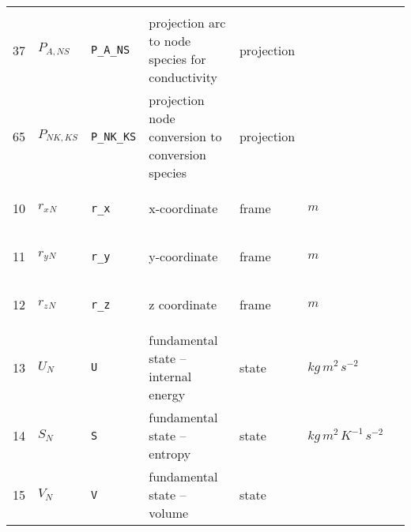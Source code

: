 \begin{longtable}{|p{1cm}|p{2.5cm}|p{4.5cm}|p{8cm}|p{3.0cm}|p{3cm}|p{1cm}|}
             & \\
    37
             & \hypertarget{"v:37"}{ $ {P}{_{A, {N S}}} $}
             & \verb|P_A_NS|
             & projection arc to node species for conductivity
             & \begin{lay}projection \end{lay}
             & $  $
             & \\
    65
             & \hypertarget{"v:65"}{ $ {P}{_{{N K}, {K S}}} $}
             & \verb|P_NK_KS|
             & projection node conversion to conversion species
             & \begin{lay}projection \end{lay}
             & $  $
             & \\
    10
             & \hypertarget{"v:10"}{ $ {{r_x}}{_{N}} $}
             & \verb|r_x|
             & x-coordinate
             & \begin{lay}frame \end{lay}
             & $ m  $
             & \\
    11
             & \hypertarget{"v:11"}{ $ {{r_y}}{_{N}} $}
             & \verb|r_y|
             & y-coordinate
             & \begin{lay}frame \end{lay}
             & $ m  $
             & \\
    12
             & \hypertarget{"v:12"}{ $ {{r_z}}{_{N}} $}
             & \verb|r_z|
             & z coordinate
             & \begin{lay}frame \end{lay}
             & $ m  $
             & \\
    13
             & \hypertarget{"v:13"}{ $ {U}{_{N}} $}
             & \verb|U|
             & fundamental state -- internal energy
             & \begin{lay}state \end{lay}
             & $ kg \,m^{2} \,s^{-2} \, $
             & \\
    14
             & \hypertarget{"v:14"}{ $ {S}{_{N}} $}
             & \verb|S|
             & fundamental state -- entropy
             & \begin{lay}state \end{lay}
             & $ kg \,m^{2} \,K^{-1} \,s^{-2} \, $
             & \\
    15
             & \hypertarget{"v:15"}{ $ {V}{_{N}} $}
             & \verb|V|
             & fundamental state -- volume
             & \begin{lay}state \end{lay}

\end{longtable}
